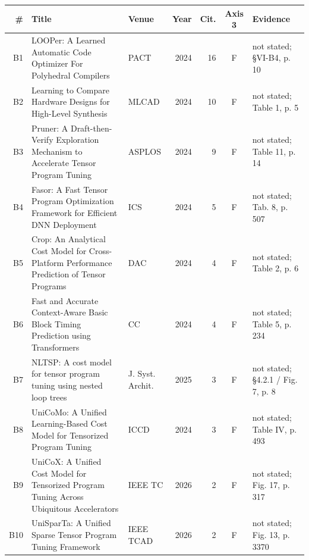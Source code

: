 \begin{tabular}{rp{6.2cm}lrrcl}
\toprule
\# & Title & Venue & Year & Cit. & Axis 3 & Evidence \\
\midrule
B1 & LOOPer: A Learned Automatic Code Optimizer For Polyhedral Compilers & PACT & 2024 & 16 & F & not stated; \S{}VI-B4, p. 10 \\
B2 & Learning to Compare Hardware Designs for High-Level Synthesis & MLCAD & 2024 & 10 & F & not stated; Table 1, p. 5 \\
B3 & Pruner: A Draft-then-Verify Exploration Mechanism to Accelerate Tensor Program Tuning & ASPLOS & 2024 & 9 & F & not stated; Table 11, p. 14 \\
B4 & Fasor: A Fast Tensor Program Optimization Framework for Efficient DNN Deployment & ICS & 2024 & 5 & F & not stated; Tab. 8, p. 507 \\
B5 & Crop: An Analytical Cost Model for Cross-Platform Performance Prediction of Tensor Programs & DAC & 2024 & 4 & F & not stated; Table 2, p. 6 \\
B6 & Fast and Accurate Context-Aware Basic Block Timing Prediction using Transformers & CC & 2024 & 4 & F & not stated; Table 5, p. 234 \\
B7 & NLTSP: A cost model for tensor program tuning using nested loop trees & J. Syst. Archit. & 2025 & 3 & F & not stated; \S{}4.2.1 / Fig. 7, p. 8 \\
B8 & UniCoMo: A Unified Learning-Based Cost Model for Tensorized Program Tuning & ICCD & 2024 & 3 & F & not stated; Table IV, p. 493 \\
B9 & UniCoX: A Unified Cost Model for Tensorized Program Tuning Across Ubiquitous Accelerators & IEEE TC & 2026 & 2 & F & not stated; Fig. 17, p. 317 \\
B10 & UniSparTa: A Unified Sparse Tensor Program Tuning Framework & IEEE TCAD & 2026 & 2 & F & not stated; Fig. 13, p. 3370 \\
\bottomrule
\end{tabular}

